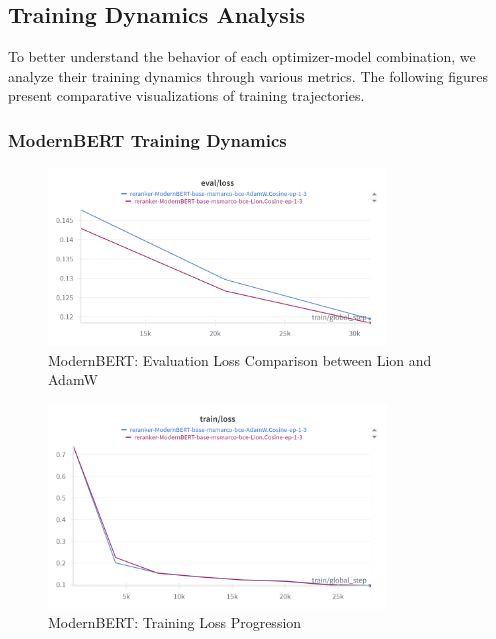 \subsection{Training Dynamics Analysis}

To better understand the behavior of each optimizer-model combination, we analyze their training dynamics through various metrics. The following figures present comparative visualizations of training trajectories.

\subsubsection{ModernBERT Training Dynamics}

\begin{figure}[htbp]
    \centering
    \includegraphics[width=0.8\textwidth]{Figures/modernBERT-Lion-AdamW-eval_loss.png}
    \caption{ModernBERT: Evaluation Loss Comparison between Lion and AdamW}
    \label{fig:modernbert_eval_loss}
\end{figure}

\begin{figure}[htbp]
    \centering
    \includegraphics[width=0.8\textwidth]{Figures/modernBERT-Lion-adamW-train_loss.png}
    \caption{ModernBERT: Training Loss Progression}
    \label{fig:modernbert_train_loss}
\end{figure}

